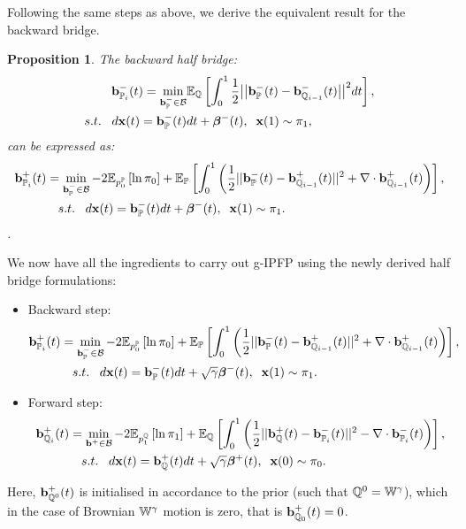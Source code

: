 \documentclass[a4paper,12pt,twoside,openright]{report}
\newtheorem{proposition}{Proposition}
\theoremstyle{definition}
\begin{document}
Following the same steps as above, we derive the equivalent result for the backward bridge.
\begin{proposition}
The backward half bridge:
\begin{align*} 
   {\mathbf{b}}^{-}_{{\mathbb{P}}_{i}}(t) =\min_{{\mathbf{b}}_{{\mathbb{P}}}^{-} \in {\mathcal{B}} } & \mathbb{E}_{\mathbb{Q}}\left[\int_0^1 \frac{1}{2}\big|\big|{\mathbf{b}}_{\mathbb{P}}^{-}(t) -{\mathbf{b}}^{-}_{{\mathbb{Q}}_{i-1}}(t)\big|\big|^2 dt\right], \nonumber \\
    s.t.\;\;\; d{\mathbf{x}}(t) = {\mathbf{b}}_{\mathbb{P}}^{-}(t) &dt +  {\bm{\beta}}^{-}(t), \;\; {\mathbf{x}}(1) \sim \pi_1,
\end{align*}
can be expressed as:
\begin{align} \label{eq:div_control_backward}
   {\mathbf{b}}^{+}_{{\mathbb{P}}_{i}}(t) =\min_{{\mathbf{b}}_{\mathbb{P}}^{-} \in {\mathcal{B}} } -2\mathbb{E}_{p^{{\mathbb{P}}}_0}\left[\operatorname{ln} \pi_0 \right] &+ \mathbb{E}_{{\mathbb{P}}}\left[\int_0^1 \left(\frac{1}{2}||{\mathbf{b}}_{\mathbb{P}}^{-}(t) - {\mathbf{b}}_{{\mathbb{Q}}_{i-1}}^{+}(t)||^2 + \nabla\cdot{\mathbf{b}}^{+}_{{\mathbb{Q}}_{i-1}}(t) \right)\right], \nonumber \\
    s.t.\;\;\; d{\mathbf{x}}(t) = {\mathbf{b}}_{\mathbb{P}}^{-}(t) &dt +  {\bm{\beta}}^{-}(t), \;\; {\mathbf{x}}(1) \sim \pi_1.
\end{align}.
\end{proposition}
We now have all the ingredients to carry out g-IPFP using the newly derived half bridge formulations:
\begin{itemize}
    \item Backward step:
    \begin{align*}
   {\mathbf{b}}^{+}_{{\mathbb{P}}_{i}}(t) =\min_{{\mathbf{b}}_{\mathbb{P}}^{-} \in {\mathcal{B}} } -2\mathbb{E}_{p^{{\mathbb{P}}}_0}\left[\operatorname{ln} \pi_0 \right] &+ \mathbb{E}_{{\mathbb{P}}}\left[\int_0^1 \left(\frac{1}{2}||{\mathbf{b}}_{\mathbb{P}}^{-}(t) - {\mathbf{b}}_{{\mathbb{Q}}_{i-1}}^{+}(t)||^2 + \nabla\cdot{\mathbf{b}}^{+}_{{\mathbb{Q}}_{i-1}}(t) \right)\right], \nonumber \\
    s.t.\;\;\; d{\mathbf{x}}(t) = {\mathbf{b}}_{\mathbb{P}}^{-}(t) &dt + \sqrt{\gamma} {\bm{\beta}}^{-}(t), \;\; {\mathbf{x}}(1) \sim \pi_1.
    \end{align*}
    \item Forward step:
    \begin{align*} 
   {\mathbf{b}}^{+}_{{\mathbb{Q}}_{i}}(t) =\min_{{\mathbf{b}}^{+} \in {\mathcal{B}} } -2\mathbb{E}_{p^{{\mathbb{Q}}}_1}\left[\operatorname{ln} \pi_1 \right] &+ \mathbb{E}_{{\mathbb{Q}}}\left[\int_0^1 \left(\frac{1}{2}||{\mathbf{b}}_{\mathbb{Q}}^{+}(t) - {\mathbf{b}}_{{\mathbb{P}}_{i}}^{-}(t)||^2 - \nabla\cdot{\mathbf{b}}^{-}_{{\mathbb{P}}_{i}}(t) \right)\right], \nonumber \\
    s.t.\;\;\; d{\mathbf{x}}(t) = {\mathbf{b}}_{\mathbb{Q}}^{+}(t) &dt + \sqrt{\gamma} {\bm{\beta}}^{+}(t), \;\; {\mathbf{x}}(0) \sim \pi_0.
    \end{align*}
\end{itemize}
Here, ${\mathbf{b}}^{+}_{{\mathbb{Q}}^{0}}(t)$  is initialised in accordance to the prior (such that ${\mathbb{Q}}^0=\mathbb{W}^\gamma$), which in the case of Brownian $\mathbb{W}^\gamma$ motion is zero, that is ${\mathbf{b}}^{+}_{{\mathbb{Q}}_{0}}(t) =0$.
\end{document}
